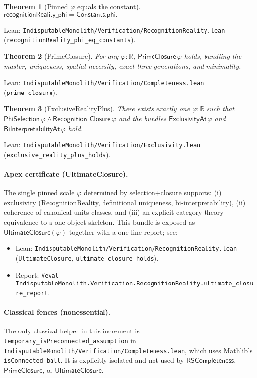 \documentclass[11pt,a4paper,twoside]{article}
\numberwithin{equation}{section}
\theoremstyle{customthm}
\newtheorem{theorem}{Theorem}[section]
\theoremstyle{customdef}
\theoremstyle{customrem}
\begin{document}
\begin{theorem}[Pinned $\varphi$ equals the constant]\label{thm:phi-equality}
\(\mathsf{recognitionReality\_phi} = \mathsf{Constants.phi}.\)
\end{theorem}
\noindent Lean: \texttt{IndisputableMonolith/Verification/RecognitionReality.lean} (\texttt{recognitionReality\_phi\_eq\_constants}).

\begin{theorem}[PrimeClosure]\label{thm:prime-closure}
For any $\varphi : \mathbb{R}$, \(\mathsf{PrimeClosure}\,\varphi\) holds, bundling the master, uniqueness, spatial necessity, exact three generations, and minimality.
\end{theorem}
\noindent Lean: \texttt{IndisputableMonolith/Verification/Completeness.lean} (\texttt{prime\_closure}).

\begin{theorem}[ExclusiveRealityPlus]\label{thm:exclusive-reality-plus}
There exists exactly one $\varphi : \mathbb{R}$ such that \(\mathsf{PhiSelection}\,\varphi \wedge \mathsf{Recognition\_Closure}\,\varphi\) and the bundles \(\mathsf{ExclusivityAt}\,\varphi\) and \(\mathsf{BiInterpretabilityAt}\,\varphi\) hold.
\end{theorem}
\noindent Lean: \texttt{IndisputableMonolith/Verification/Exclusivity.lean} (\texttt{exclusive\_reality\_plus\_holds}).

\paragraph{Apex certificate (UltimateClosure).} The single pinned scale $\varphi$ determined by selection+closure supports: (i) exclusivity (RecognitionReality, definitional uniqueness, bi‑interpretability), (ii) coherence of canonical units classes, and (iii) an explicit category‑theory equivalence to a one‑object skeleton. This bundle is exposed as $\mathsf{UltimateClosure}(\varphi)$ together with a one‑line report; see:
\begin{itemize}[leftmargin=*]
  \item Lean: \texttt{IndisputableMonolith/Verification/RecognitionReality.lean} (\texttt{UltimateClosure}, \texttt{ultimate\_closure\_holds}).
  \item Report: \texttt{\#eval IndisputableMonolith.Verification.RecognitionReality.ultimate\_closure\_report}.
\end{itemize}

\paragraph{Classical fences (nonessential).} The only classical helper in this increment is
\texttt{temporary\_isPreconnected\_assumption} in \texttt{IndisputableMonolith/Verification/Completeness.lean}, which uses Mathlib's \texttt{isConnected\_ball}. It is explicitly isolated and not used by \(\mathsf{RSCompleteness}\), \(\mathsf{PrimeClosure}\), or \(\mathsf{UltimateClosure}\).
\end{document}
